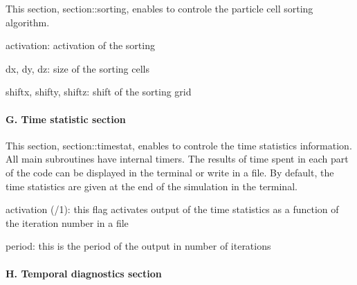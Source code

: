 This section, {\ttfamily section\+::sorting}, enables to controle the particle cell sorting algorithm.


\begin{DoxyItemize}
\item {\ttfamily activation}\+: activation of the sorting
\item {\ttfamily dx}, {\ttfamily dy}, {\ttfamily dz}\+: size of the sorting cells
\item {\ttfamily shiftx}, {\ttfamily shifty}, {\ttfamily shiftz}\+: shift of the sorting grid
\end{DoxyItemize}

\paragraph*{G. Time statistic section}

This section, {\ttfamily section\+::timestat}, enables to controle the time statistics information. All main subroutines have internal timers. The results of time spent in each part of the code can be displayed in the terminal or write in a file. By default, the time statistics are given at the end of the simulation in the terminal.


\begin{DoxyItemize}
\item {\ttfamily activation} ({/1})\+: this flag activates output of the time statistics as a function of the iteration number in a file
\item {\ttfamily period}\+: this is the period of the output in number of iterations
\end{DoxyItemize}

\paragraph*{H. Temporal diagnostics section}